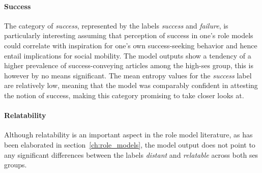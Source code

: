 \paragraph{Success}
The category of \textit{success}, represented by the labels \textit{success} and \textit{failure}, is particularly interesting assuming that perception of success in one's role models could correlate with inspiration for one's own success-seeking behavior and hence entail implications for social mobility. The model outputs show a tendency of a higher prevalence of success-conveying articles among the high-\gls{ses} group, this is however by no means significant. The mean entropy values for the \textit{success} label are relatively low, meaning that the model was comparably confident in attesting the notion of success, making this category promising to take closer looks at.

\paragraph{Relatability}
Although relatability is an important aspect in the role model literature, as has been elaborated in section~\ref{ch:role_models}, the model output does not point to any significant differences between the labels \textit{distant} and \textit{relatable} across both \gls{ses} groups.

